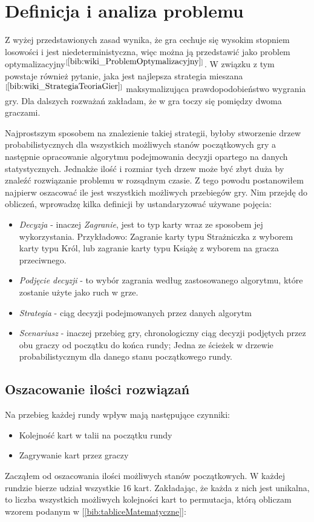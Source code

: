 \section{Definicja i analiza problemu}
\label{sec:opisProblemu}
Z wyżej przedstawionych zasad wynika, że gra cechuje się wysokim stopniem losowości i jest niedeterministyczna, więc można ją przedstawić jako problem optymalizacyjny$^{[\ref{bib:wiki_ProblemOptymalizacyjny}]}$. W związku z tym powstaje również pytanie, jaka jest najlepsza strategia mieszana$^{[\ref{bib:wiki_StrategiaTeoriaGier}]}$ maksymalizująca prawdopodobieństwo wygrania gry. Dla dalszych rozważań zakładam, że w gra toczy się pomiędzy dwoma graczami.

Najprostszym sposobem na znalezienie takiej strategii, byłoby stworzenie drzew probabilistycznych dla wszystkich możliwych stanów początkowych gry a następnie opracowanie algorytmu podejmowania decyzji opartego na danych statystycznych. Jednakże ilość i rozmiar tych drzew może być zbyt duża by znaleźć rozwiązanie problemu w rozsądnym czasie. Z tego powodu postanowiłem najpierw oszacować ile jest wszystkich możliwych przebiegów gry. Nim przejdę do obliczeń, wprowadzę kilka definicji by ustandaryzować używane pojęcia:
\begin{itemize}
	\item \textit{Decyzja} - inaczej \textit{Zagranie}, jest to typ karty wraz ze sposobem jej wykorzystania. Przykładowo: Zagranie karty typu Strażniczka z wyborem karty typu Król, lub zagranie karty typu Książę z wyborem na gracza przeciwnego.
	\item \textit{Podjęcie decyzji} - to wybór zagrania według zastosowanego algorytmu, które zostanie użyte jako ruch w grze.
	\item \textit{Strategia} - ciąg decyzji podejmowanych przez danych algorytm
	\item \textit{Scenariusz} - inaczej przebieg gry, chronologiczny ciąg decyzji podjętych przez obu graczy od początku do końca rundy; Jedna ze ścieżek w drzewie probabilistycznym dla danego stanu początkowego rundy.
\end{itemize}

\subsection*{Oszacowanie ilości rozwiązań}
Na przebieg każdej rundy wpływ mają następujące czynniki:
\begin{itemize}
	\item Kolejność kart w talii na początku rundy
	\item Zagrywanie kart przez graczy
\end{itemize}
Zacząłem od oszacowania ilości możliwych stanów początkowych. W każdej rundzie bierze udział wszystkie 16 kart. Zakładając, że każda z nich jest unikalna, to  liczba wszystkich możliwych kolejności kart to permutacja, którą obliczam wzorem podanym w [\ref{bib:tabliceMatematyczne}]:

